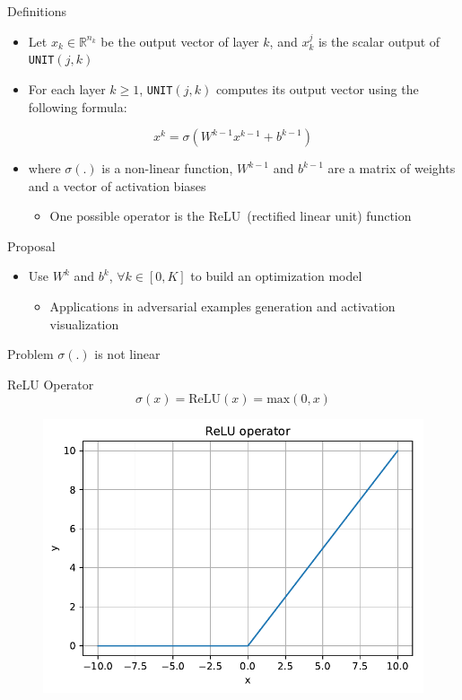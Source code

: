\documentclass{beamer}
\begin{document}
\begin{frame}{Definitions}
  \begin{itemize}
  \item Let $x_k \in \mathbb{R}^{n_k}$ be the output vector of layer $k$, and $x^j_k$ is the scalar output of \texttt{UNIT}$(j,k)$
  \item For each layer $k \geq 1$, \texttt{UNIT}$(j,k)$ computes its output vector using the following formula:
  \end{itemize}
  $$
  x^k = \sigma(W^{k-1} x^{k-1} + b^{k-1})
  $$
  \begin{itemize}
  \item where $\sigma(.)$ is a non-linear function, $W^{k-1}$ and $b^{k-1}$ are a matrix of weights and a vector of activation biases
    \begin{itemize}
    \item One possible operator is the ReLU~(rectified linear unit) function
    \end{itemize}
  \end{itemize}
\end{frame}

\begin{frame}{Proposal}
  \begin{itemize}
  \item Use $W^k$ and $b^k$, $\forall k \in [0, K]$ to build an optimization model
    \begin{itemize}
    \item Applications in adversarial examples generation and activation visualization
    \end{itemize}
  \end{itemize}
  \pause
  \begin{block}{Problem}
    \centering
    $\sigma(.)$ is not linear
  \end{block}
\end{frame}

\begin{frame}{ReLU Operator}
  $$ \sigma(x) = \text{ReLU}(x) = \text{max}(0, x) $$
  \pause
  \begin{figure}[H]
    \centering
    \includegraphics[width=0.8\columnwidth]{relu}
  \end{figure}
\end{frame}
\end{document}
